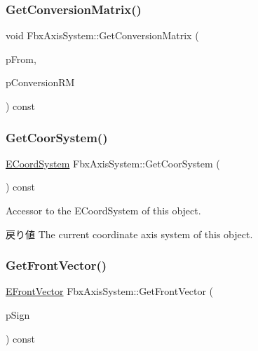 \mbox{\label{class_fbx_axis_system_ae365f46f757b83df6426e5469938e8a0}} 
\subsubsection{\texorpdfstring{Get\+Conversion\+Matrix()}{GetConversionMatrix()}}
{\footnotesize\ttfamily void Fbx\+Axis\+System\+::\+Get\+Conversion\+Matrix (\begin{DoxyParamCaption}\item[{const \hyperlink{class_fbx_axis_system}{Fbx\+Axis\+System} \&}]{p\+From,  }\item[{\hyperlink{class_fbx_matrix}{Fbx\+Matrix} \&}]{p\+Conversion\+RM }\end{DoxyParamCaption}) const\hspace{0.3cm}{\ttfamily [protected]}}

\mbox{\label{class_fbx_axis_system_a6ebdf99e9754d3bd83d3a8f98544b331}} 
\subsubsection{\texorpdfstring{Get\+Coor\+System()}{GetCoorSystem()}}
{\footnotesize\ttfamily \hyperlink{class_fbx_axis_system_a7cf0485846b560fa34f86932c02ec333}{E\+Coord\+System} Fbx\+Axis\+System\+::\+Get\+Coor\+System (\begin{DoxyParamCaption}{ }\end{DoxyParamCaption}) const}

Accessor to the E\+Coord\+System of this object. \begin{DoxyReturn}{戻り値}
The current coordinate axis system of this object. 
\end{DoxyReturn}
\mbox{\label{class_fbx_axis_system_a523996d3b195bf6016ab7c0333a5d389}} 
\subsubsection{\texorpdfstring{Get\+Front\+Vector()}{GetFrontVector()}}
{\footnotesize\ttfamily \hyperlink{class_fbx_axis_system_a34bce1daad7ed6ae71916bb825d3ec87}{E\+Front\+Vector} Fbx\+Axis\+System\+::\+Get\+Front\+Vector (\begin{DoxyParamCaption}\item[{int \&}]{p\+Sign }\end{DoxyParamCaption}) const}

